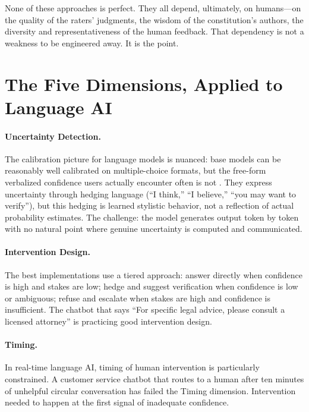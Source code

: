 None of these approaches is perfect. They all depend, ultimately, on humans---on the quality of the raters' judgments, the wisdom of the constitution's authors, the diversity and representativeness of the human feedback. That dependency is not a weakness to be engineered away. It is the point.

\section{The Five Dimensions, Applied to Language AI}
\label{sec:five-dimensions-language}

\paragraph{Uncertainty Detection.} The calibration picture for language models is nuanced: base models can be reasonably well calibrated on multiple-choice formats, but the free-form verbalized confidence users actually encounter often is not \autocite{kadavath2022language}. They express uncertainty through hedging language (``I think,'' ``I believe,'' ``you may want to verify''), but this hedging is learned stylistic behavior, not a reflection of actual probability estimates. The challenge: the model generates output token by token with no natural point where genuine uncertainty is computed and communicated.

\paragraph{Intervention Design.} The best implementations use a tiered approach: answer directly when confidence is high and stakes are low; hedge and suggest verification when confidence is low or ambiguous; refuse and escalate when stakes are high and confidence is insufficient. The chatbot that says ``For specific legal advice, please consult a licensed attorney'' is practicing good intervention design.

\paragraph{Timing.} In real-time language AI, timing of human intervention is particularly constrained. A customer service chatbot that routes to a human after ten minutes of unhelpful circular conversation has failed the Timing dimension. Intervention needed to happen at the first signal of inadequate confidence.

